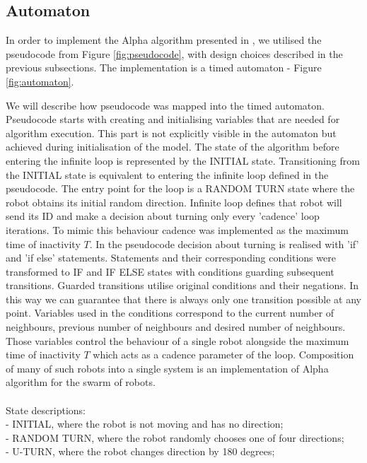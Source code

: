 \subsection{Automaton}
In order to implement the Alpha algorithm presented in \cite{Minimalist_Coherent_Swarming_of_Wireless_Networked_Autonomous_Mobile_Robots}, we utilised the pseudocode from Figure \ref{fig:pseudocode}, with design choices described in the previous subsections. The implementation is a timed automaton - Figure \ref{fig:automaton}.

We will describe how pseudocode was mapped into the timed automaton. Pseudocode starts with creating and initialising variables that are needed for algorithm execution. This part is not explicitly visible in the automaton but achieved during initialisation of the model. The state of the algorithm before entering the infinite loop is represented by the INITIAL state. Transitioning from the INITIAL state is equivalent to entering the infinite loop defined in the pseudocode. The entry point for the loop is a RANDOM TURN state where the robot obtains its initial random direction. Infinite loop defines that robot will send its ID and make a decision about turning only every 'cadence' loop iterations. To mimic this behaviour cadence was implemented as the maximum time of inactivity $T$. In the pseudocode  decision about turning is realised with 'if' and 'if else' statements. Statements and their corresponding conditions were transformed to IF and IF ELSE states with conditions guarding subsequent transitions. Guarded transitions utilise original conditions and their negations. In this way we can guarantee that there is always only one transition possible at any point. Variables used in the conditions correspond to the current number of neighbours, previous number of neighbours and desired number of neighbours. Those variables control the behaviour of a single robot alongside the maximum time of inactivity $T$ which acts as a cadence parameter of the loop. Composition of many of such robots into a single system is an implementation of Alpha algorithm for the swarm of robots.\\\\
State descriptions:\\
- INITIAL, where the robot is not moving and has no direction;\\
- RANDOM TURN, where the robot randomly chooses one of four directions;\\
- U-TURN, where the robot changes direction by 180 degrees;\\
